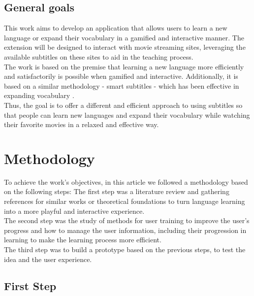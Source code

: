 \documentclass[12pt]{article}
\begin{document}
\subsection{General goals}

This work aims to develop an application that allows users to learn a new language or expand their vocabulary in a gamified and interactive manner. The extension will be designed to interact with movie streaming sites, leveraging the available subtitles on these sites to aid in the teaching process. \\
The work is based on the premise that learning a new language more efficiently and satisfactorily is possible when gamified and interactive. Additionally, it is based on a similar methodology - smart subtitles - which has been effective in expanding vocabulary \cite{Kovacs14}. \\
Thus, the goal is to offer a different and efficient approach to using subtitles so that people can learn new languages and expand their vocabulary while watching their favorite movies in a relaxed and effective way.



\section{Methodology}
To achieve the work's objectives, in this article we followed a methodology based on the following steps:
The first step was a literature review and gathering references for similar works or theoretical foundations to turn language learning into a more playful and interactive experience. \\
The second step was the study of methods for user training to improve the user's progress and how to manage the user information, including their progression in learning to make the learning process more efficient. \\
The third step was to build a prototype based on the previous steps, to test the idea and the user experience. \\
\subsection{First Step}
\end{document}
